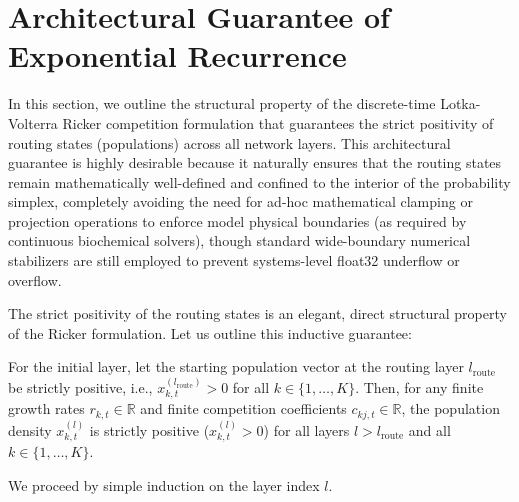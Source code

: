 \documentclass{article}
\theoremstyle{plain}
\theoremstyle{definition}
\theoremstyle{remark}
\begin{document}










\newpage
\appendix
\onecolumn
\section{Architectural Guarantee of Exponential Recurrence}
\label{app:positivity_proof}

In this section, we outline the structural property of the discrete-time Lotka-Volterra Ricker competition formulation that guarantees the strict positivity of routing states (populations) across all network layers. This architectural guarantee is highly desirable because it naturally ensures that the routing states remain mathematically well-defined and confined to the interior of the probability simplex, completely avoiding the need for ad-hoc mathematical clamping or projection operations to enforce model physical boundaries (as required by continuous biochemical solvers), though standard wide-boundary numerical stabilizers are still employed to prevent systems-level float32 underflow or overflow.

The strict positivity of the routing states is an elegant, direct structural property of the Ricker formulation. Let us outline this inductive guarantee:

For the initial layer, let the starting population vector at the routing layer $l_{\text{route}}$ be strictly positive, i.e., $x_{k, t}^{(l_{\text{route}})} > 0$ for all $k \in \{1, \dots, K\}$. Then, for any finite growth rates $r_{k, t} \in \mathbb{R}$ and finite competition coefficients $c_{kj, t} \in \mathbb{R}$, the population density $x_{k, t}^{(l)}$ is strictly positive ($x_{k, t}^{(l)} > 0$) for all layers $l > l_{\text{route}}$ and all $k \in \{1, \dots, K\}$.

We proceed by simple induction on the layer index $l$.
\end{document}
